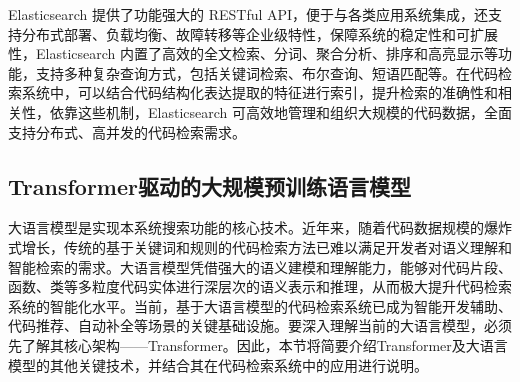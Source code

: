 \documentclass[UTF8,a4paper,12pt]{ctexart}
\numberwithin{equation}{section}
\begin{document}
Elasticsearch 提供了功能强大的 RESTful API\cite{ref13.9}，便于与各类应用系统集成，还支持分布式部署、负载均衡、故障转移等企业级特性，保障系统的稳定性和可扩展性，Elasticsearch 内置了高效的全文检索、分词、聚合分析、排序和高亮显示等功能，支持多种复杂查询方式，包括关键词检索、布尔查询、短语匹配等。在代码检索系统中，可以结合代码结构化表达提取的特征进行索引，提升检索的准确性和相关性，依靠这些机制，Elasticsearch 可高效地管理和组织大规模的代码数据，全面支持分布式、高并发的代码检索需求。\par


\subsection{Transformer驱动的大规模预训练语言模型}
大语言模型是实现本系统搜索功能的核心技术。近年来，随着代码数据规模的爆炸式增长，传统的基于关键词和规则的代码检索方法已难以满足开发者对语义理解和智能检索的需求。大语言模型凭借强大的语义建模和理解能力，能够对代码片段、函数、类等多粒度代码实体进行深层次的语义表示和推理，从而极大提升代码检索系统的智能化水平。当前，基于大语言模型的代码检索系统已成为智能开发辅助、代码推荐、自动补全等场景的关键基础设施。要深入理解当前的大语言模型，必须先了解其核心架构——Transformer。因此，本节将简要介绍Transformer及大语言模型的其他关键技术，并结合其在代码检索系统中的应用进行说明。
\end{document}
